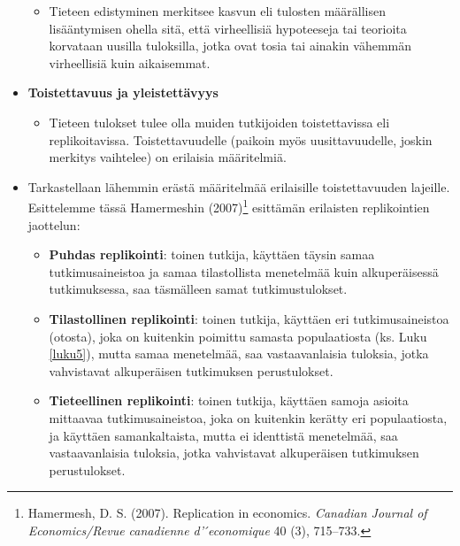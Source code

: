 \documentclass[
]{book}
\providecommand{\tightlist}{%
  \setlength{\itemsep}{0pt}\setlength{\parskip}{0pt}}
\begin{document}
\begin{defblock}{}
\begin{itemize}
  \begin{itemize}
  \tightlist
  \item
    Tieteen edistyminen merkitsee kasvun eli tulosten määrällisen lisääntymisen ohella sitä, että virheellisiä hypoteeseja tai teorioita korvataan uusilla tuloksilla, jotka ovat tosia tai ainakin vähemmän virheellisiä kuin aikaisemmat.
  \end{itemize}
\item
  \textbf{Toistettavuus ja yleistettävyys}

  \begin{itemize}
  \tightlist
  \item
    Tieteen tulokset tulee olla muiden tutkijoiden toistettavissa eli replikoitavissa. Toistettavuudelle (paikoin myös uusittavuudelle, joskin merkitys vaihtelee) on erilaisia määritelmiä.
  \end{itemize}
\end{itemize}

\end{defblock}

\begin{itemize}
\tightlist
\item
  Tarkastellaan lähemmin erästä määritelmää erilaisille toistettavuuden lajeille. Esittelemme tässä Hamermeshin (2007)\footnote{Hamermesh, D. S. (2007). Replication in economics. \emph{Canadian Journal of Economics/Revue canadienne d' ́economique} 40 (3), 715--733.} esittämän erilaisten replikointien jaottelun:

  \begin{itemize}
  \tightlist
  \item
    \textbf{Puhdas replikointi}: toinen tutkija, käyttäen täysin samaa tutkimusaineistoa ja samaa tilastollista menetelmää kuin alkuperäisessä tutkimuksessa, saa täsmälleen samat tutkimustulokset.
  \item
    \textbf{Tilastollinen replikointi}: toinen tutkija, käyttäen eri tutkimusaineistoa (otosta), joka on kuitenkin poimittu samasta populaatiosta (ks. Luku \ref{luku5}), mutta samaa menetelmää, saa vastaavanlaisia tuloksia, jotka vahvistavat alkuperäisen tutkimuksen perustulokset.
  \item
    \textbf{Tieteellinen replikointi}: toinen tutkija, käyttäen samoja asioita mittaavaa tutkimusaineistoa, joka on kuitenkin kerätty eri populaatiosta, ja käyttäen samankaltaista, mutta ei identtistä menetelmää, saa vastaavanlaisia tuloksia, jotka vahvistavat alkuperäisen tutkimuksen perustulokset.
  \end{itemize}
\end{itemize}
\end{document}
